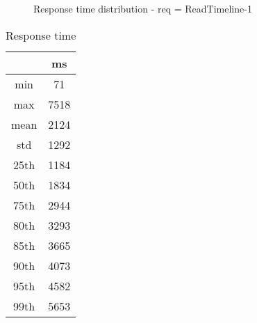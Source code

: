 \begin{minipage}{0.75\linewidth}
\begin{figure}[h]
\begin{adjustbox}{max width=1.0\linewidth, keepaspectratio}
  \end{adjustbox}
  \caption{Response time distribution - req = ReadTimeline-1}
\end{figure}
\end{minipage}\hfill\begin{minipage}{0.18\linewidth}
\begin{table}[h]
\begin{tabular}{|cc|}
\hline
\textbf{} & \textbf{ms}\\ \hline
 \Xhline{0.005\arrayrulewidth}
min & 71\\
 \Xhline{0.005\arrayrulewidth}
max & 7518\\
 \Xhline{0.005\arrayrulewidth}
mean & 2124\\
 \Xhline{0.005\arrayrulewidth}
std & 1292\\
\hline
\hline
 \Xhline{0.005\arrayrulewidth}
25th & 1184\\
 \Xhline{0.005\arrayrulewidth}
50th & 1834\\
 \Xhline{0.005\arrayrulewidth}
75th & 2944\\
 \Xhline{0.005\arrayrulewidth}
80th & 3293\\
 \Xhline{0.005\arrayrulewidth}
85th & 3665\\
 \Xhline{0.005\arrayrulewidth}
90th & 4073\\
 \Xhline{0.005\arrayrulewidth}
95th & 4582\\
 \Xhline{0.005\arrayrulewidth}
99th & 5653\\
\hline
\end{tabular}
\caption{Response time}
\end{table}
\end{minipage}\hfill